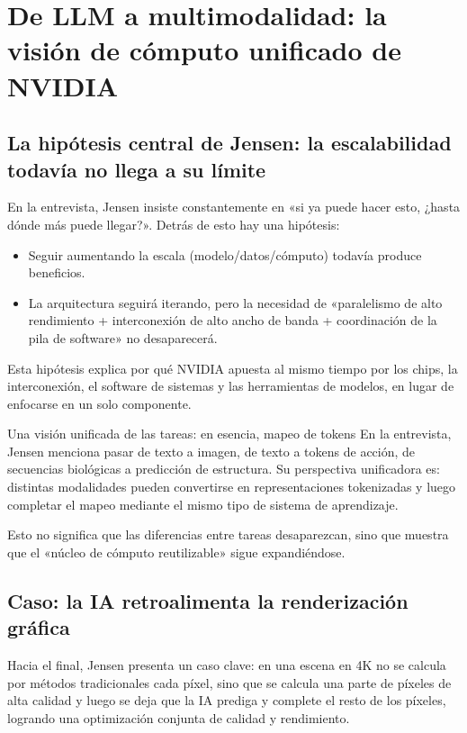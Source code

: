 \section{De LLM a multimodalidad: la visión de cómputo unificado de NVIDIA}

\subsection{La hipótesis central de Jensen: la escalabilidad todavía no llega a su límite}

En la entrevista, Jensen insiste constantemente en «si ya puede hacer esto, ¿hasta dónde más puede llegar?». Detrás de esto hay una hipótesis:
\begin{itemize}
    \item Seguir aumentando la escala (modelo/datos/cómputo) todavía produce beneficios.
    \item La arquitectura seguirá iterando, pero la necesidad de «paralelismo de alto rendimiento + interconexión de alto ancho de banda + coordinación de la pila de software» no desaparecerá.
\end{itemize}

Esta hipótesis explica por qué NVIDIA apuesta al mismo tiempo por los chips, la interconexión, el software de sistemas y las herramientas de modelos, en lugar de enfocarse en un solo componente.

\begin{importantbox}{Una visión unificada de las tareas: en esencia, mapeo de tokens}
En la entrevista, Jensen menciona pasar de texto a imagen, de texto a tokens de acción, de secuencias biológicas a predicción de estructura. Su perspectiva unificadora es: distintas modalidades pueden convertirse en representaciones tokenizadas y luego completar el mapeo mediante el mismo tipo de sistema de aprendizaje.

Esto no significa que las diferencias entre tareas desaparezcan, sino que muestra que el «núcleo de cómputo reutilizable» sigue expandiéndose.
\end{importantbox}

\subsection{Caso: la IA retroalimenta la renderización gráfica}

Hacia el final, Jensen presenta un caso clave: en una escena en 4K no se calcula por métodos tradicionales cada píxel, sino que se calcula una parte de píxeles de alta calidad y luego se deja que la IA prediga y complete el resto de los píxeles, logrando una optimización conjunta de calidad y rendimiento.

